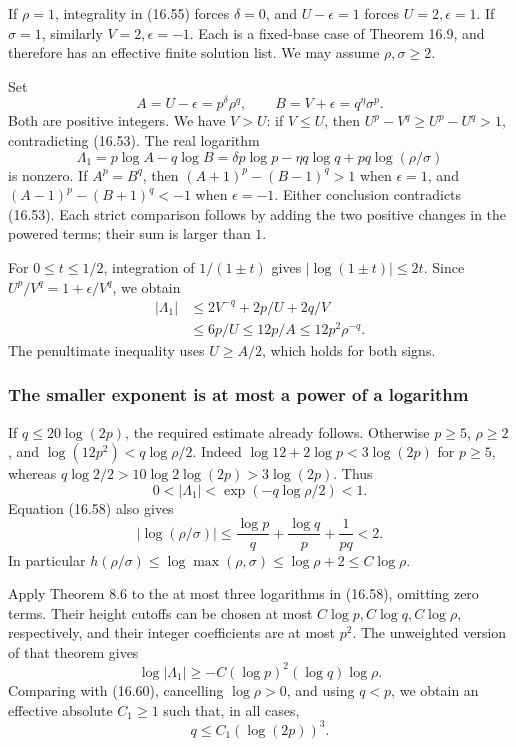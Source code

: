\documentclass[
  11pt,
  a4paper,
]{article}
\begin{document}
If \(\rho=1\), integrality in (16.55) forces \(\delta=0\), and
\(U-\epsilon=1\) forces \(U=2,\epsilon=1\). If \(\sigma=1\), similarly
\(V=2,\epsilon=-1\). Each is a fixed-base case of Theorem 16.9, and
therefore has an effective finite solution list. We may assume
\(\rho,\sigma\geq2\).

Set \[
 A=U-\epsilon=p^\delta\rho^q,\qquad
 B=V+\epsilon=q^\eta\sigma^p.
 \tag{16.57}
\] Both are positive integers. We have \(V>U\): if \(V\leq U\), then
\(U^p-V^q\geq U^p-U^q>1\), contradicting (16.53). The real logarithm \[
 \Lambda_1=p\log A-q\log B
   =\delta p\log p-\eta q\log q+pq\log(\rho/\sigma)
 \tag{16.58}
\] is nonzero. If \(A^p=B^q\), then \((A+1)^p-(B-1)^q>1\) when
\(\epsilon=1\), and \((A-1)^p-(B+1)^q<-1\) when \(\epsilon=-1\). Either
conclusion contradicts (16.53). Each strict comparison follows by adding
the two positive changes in the powered terms; their sum is larger than
\(1\).

For \(0\leq t\leq1/2\), integration of \(1/(1\pm t)\) gives
\(|\log(1\pm t)|\leq2t\). Since \(U^p/V^q=1+\epsilon/V^q\), we obtain \[
 \begin{aligned}
 |\Lambda_1|
 &\leq 2V^{-q}+2p/U+2q/V\\
 &\leq 6p/U
 \leq12p/A
 \leq12p^2\rho^{-q}.
 \end{aligned}
 \tag{16.59}
\] The penultimate inequality uses \(U\geq A/2\), which holds for both
signs.

\subsubsection{The smaller exponent is at most a power of a
logarithm}\label{the-smaller-exponent-is-at-most-a-power-of-a-logarithm}

If \(q\leq20\log(2p)\), the required estimate already follows. Otherwise
\(p\geq5\), \(\rho\geq2\), and \(\log(12p^2)<q\log\rho/2\). Indeed
\(\log12+2\log p<3\log(2p)\) for \(p\geq5\), whereas
\(q\log2/2>10\log2\log(2p)>3\log(2p)\). Thus \[
 0<|\Lambda_1|<\exp(-q\log\rho/2)<1.
 \tag{16.60}
\] Equation (16.58) also gives \[
 |\log(\rho/\sigma)|
 \leq\frac{\log p}{q}+\frac{\log q}{p}+\frac1{pq}<2.
 \tag{16.61}
\] In particular \(h(\rho/\sigma)\leq\log\max(\rho,\sigma)
\leq\log\rho+2\leq C\log\rho\).

Apply Theorem 8.6 to the at most three logarithms in (16.58), omitting
zero terms. Their height cutoffs can be chosen at most
\(C\log p,C\log q,C\log\rho\), respectively, and their integer
coefficients are at most \(p^2\). The unweighted version of that theorem
gives \[
 \log|\Lambda_1|
 \geq-C(\log p)^2(\log q)\log\rho.
 \tag{16.62}
\] Comparing with (16.60), cancelling \(\log\rho>0\), and using \(q<p\),
we obtain an effective absolute \(C_1\geq1\) such that, in all cases, \[
 q\leq C_1(\log(2p))^3.
 \tag{16.63}
\]
\end{document}
